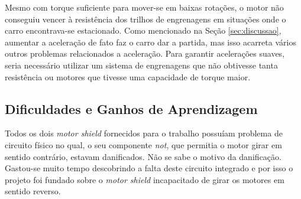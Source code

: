 	Mesmo com torque suficiente para mover-se em baixas rotações, o motor não conseguiu vencer à resistência dos trilhos de engrenagens em situações onde o carro encontrava-se estacionado. Como mencionado na Seção \ref{sec:discussao}, aumentar a aceleração de fato faz o carro dar a partida, mas isso acarreta vários outros problemas relacionados a aceleração. Para garantir acelerações suaves, seria necessário utilizar um sistema de engrenagens que não obtivesse tanta resistência ou motores que tivesse uma capacidade de torque maior.





    \subsection{Dificuldades e Ganhos de Aprendizagem}
	Todos os dois \textit{motor shield} fornecidos para o trabalho possuíam problema de circuito físico no qual, o seu componente \textit{not}, que permitia o motor girar em sentido contrário, estavam danificados. Não se sabe o motivo da danificação. Gastou-se muito tempo descobrindo a falta deste circuito integrado e por isso o projeto foi fundado sobre o \textit{motor shield} incapacitado de girar os motores em sentido reverso.

